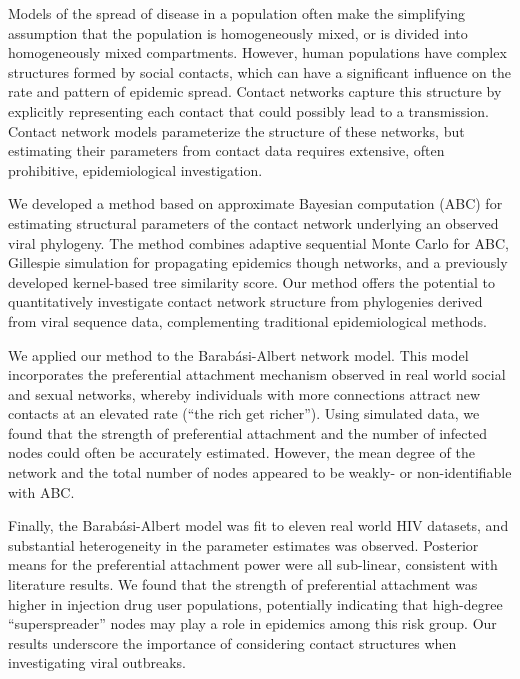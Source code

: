 Models of the spread of disease in a population often make the simplifying assumption that the population is homogeneously mixed, or is divided into homogeneously mixed compartments. However, human populations have complex structures formed by social contacts, which can have a significant influence on the rate and pattern of epidemic spread. Contact networks capture this structure by explicitly representing each contact that could possibly lead to a transmission. Contact network models parameterize the structure of these networks, but estimating their parameters from contact data requires extensive, often prohibitive, epidemiological investigation.

We developed a method based on approximate Bayesian computation (ABC) for estimating structural parameters of the contact network underlying an observed viral phylogeny. The method combines adaptive sequential Monte Carlo for ABC, Gillespie simulation for propagating epidemics though networks, and a previously developed kernel-based tree similarity score. Our method offers the potential to quantitatively investigate contact network structure from phylogenies derived from viral sequence data, complementing traditional epidemiological methods.

We applied our method to the Barab\'{a}si-Albert network model. This model incorporates the preferential attachment mechanism observed in real world social and sexual networks, whereby individuals with more connections attract new contacts at an elevated rate (``the rich get richer''). Using simulated data, we found that the strength of preferential attachment and the number of infected nodes could often be accurately estimated. However, the mean degree of the network and the total number of nodes appeared to be weakly- or non-identifiable with ABC.

 Finally, the Barab\'{a}si-Albert model was fit to eleven real world HIV datasets, and substantial heterogeneity in the parameter estimates was observed. Posterior means for the preferential attachment power were all sub-linear, consistent with literature results. We found that the strength of preferential attachment was higher in injection drug user populations, potentially indicating that high-degree ``superspreader'' nodes may play a role in epidemics among this risk group. Our results underscore the importance of considering contact structures when investigating viral outbreaks. 
